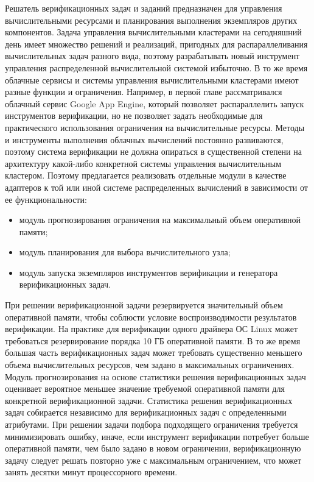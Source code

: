 Решатель верификационных задач и заданий предназначен для управления вычислительными ресурсами и планирования выполнения экземпляров других компонентов.
Задача управления вычислительными кластерами на сегодняшний день имеет множество решений и реализаций, пригодных для распараллеливания вычислительных задач разного вида, поэтому разрабатывать новый инструмент управления распределенной вычислительной системой избыточно.
В то же время облачные сервисы и системы управления вычислительными кластерами имеют разные функции и ограничения.
Например, в первой главе рассматривался облачный сервис Google App Engine, который позволяет распараллелить запуск инструментов верификации, но не позволяет задать необходимые для практического использования ограничения на вычислительные ресурсы.
Методы и инструменты выполнения облачных вычислений постоянно развиваются, поэтому система верификации не должна опираться в существенной степени на архитектуру какой-либо конкретной системы управления вычислительным кластером.
Поэтому предлагается реализовать отдельные модули в качестве адаптеров к той или иной системе распределенных вычислений в зависимости от ее функциональности:
\begin{itemize}
    \item модуль прогнозирования ограничения на максимальный объем оперативной памяти;
    \item модуль планирования для выбора вычислительного узла;    
    \item модуль запуска экземпляров инструментов верификации и генератора верификационных задач.
\end{itemize}

При решении верификационной задачи резервируется значительный объем оперативной памяти, чтобы соблюсти условие воспроизводимости результатов верификации.
На практике для верификации одного драйвера ОС Linux может требоваться резервирование порядка 10 ГБ оперативной памяти.
В то же время большая часть верификационных задач может требовать существенно меньшего объема вычислительных ресурсов, чем задано в максимальных ограничениях.
Модуль прогнозирования на основе статистики решения верификационных задач оценивает вероятное меньшее значение требуемой оперативной памяти для конкретной верификационной задачи.
Статистика решения верификационных задач собирается независимо для верификационных задач с определенными атрибутами.
При решении задачи подбора подходящего ограничения требуется минимизировать ошибку, иначе, если инструмент верификации потребует больше оперативной памяти, чем было задано в новом ограничении, верификационную задачу следует решать повторно уже с максимальным ограничением, что может занять десятки минут процессорного времени.


